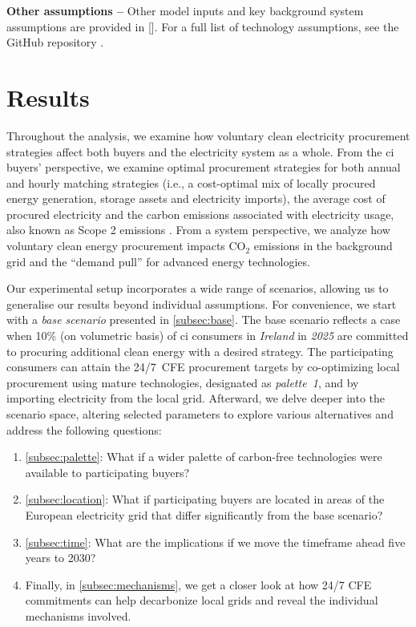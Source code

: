 \documentclass[11pt, 5p, nopreprintline]{elsarticle}
\begin{document}
\textbf{Other assumptions --} Other model inputs and key background system assumptions are provided in []. For a full list of technology assumptions, see the GitHub repository \cite{github-247CFEpaper}.

\section{Results}
\label{sec:results}


Throughout the analysis, we examine how voluntary clean electricity procurement strategies affect both buyers and the electricity system as a whole.
From the \gls{ci} buyers' perspective, we examine optimal procurement strategies for both annual and hourly matching strategies (i.e., a cost-optimal mix of locally procured energy generation, storage assets and electricity imports), the average cost of procured electricity and the carbon emissions associated with electricity usage, also known as Scope 2 emissions \cite{GHGProtocolScope2}.
From a system perspective, we analyze how voluntary clean energy procurement impacts CO$_2$ emissions in the background grid and the \enquote{demand pull} for advanced energy technologies.

Our experimental setup incorporates a wide range of scenarios, allowing us to generalise our results beyond individual assumptions.
For convenience, we start with a \textit{base scenario} presented in \cref{subsec:base}.
The base scenario reflects a case when 10\% (on volumetric basis) of \gls{ci} consumers in \textit{Ireland} in \textit{2025} are committed to procuring additional clean energy with a desired strategy.
The participating consumers can attain the 24/7~CFE procurement targets by co-optimizing local procurement using mature technologies, designated as \textit{palette~1}, and by importing electricity from the local grid.
Afterward, we delve deeper into the scenario space, altering selected parameters to explore various alternatives and address the following questions:

\begin{enumerate}[-]
\item \cref{subsec:palette}: What if a wider palette of carbon-free technologies were available to participating buyers?
\item \cref{subsec:location}: What if participating buyers are located in areas of the European electricity grid that differ significantly from the base scenario?
\item \cref{subsec:time}: What are the implications if we move the timeframe ahead five years to 2030?
\item Finally, in \cref{subsec:mechanisms}, we get a closer look at how 24/7 CFE commitments can help decarbonize local grids and reveal the individual mechanisms involved.
\end{enumerate}
\end{document}
